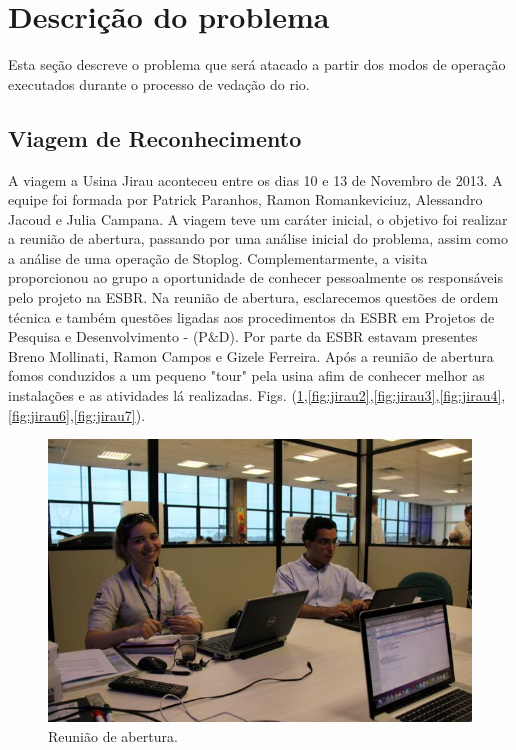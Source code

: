 

\section{Descrição do problema}
Esta seção descreve o problema que será atacado a partir dos modos de operação
executados durante o processo de vedação do rio.

\subsection{Viagem de Reconhecimento}
A viagem a Usina Jirau aconteceu entre os dias 10 e 13 de Novembro de 2013. A
equipe foi formada por Patrick Paranhos, Ramon Romankeviciuz, Alessandro Jacoud
e Julia Campana. A viagem teve um caráter inicial, o objetivo foi realizar a
reunião de abertura, passando por  uma análise inicial do problema, assim como a
análise de uma operação de Stoplog. Complementarmente, a visita proporcionou ao
grupo a oportunidade de conhecer pessoalmente os responsáveis pelo projeto na
ESBR.
Na reunião de abertura, esclarecemos questões de ordem técnica e também questões
ligadas aos procedimentos da ESBR em Projetos de Pesquisa e Desenvolvimento -
(P$\&$D).  Por parte da ESBR estavam presentes Breno Mollinati, Ramon Campos e
Gizele Ferreira. Após a reunião de abertura fomos conduzidos a um pequeno "tour"
pela usina afim de conhecer melhor as instalações e as atividades lá realizadas.
Figs.
(\ref{fig:jirau1},\ref{fig:jirau2},\ref{fig:jirau3},\ref{fig:jirau4},\ref{fig:jirau6},\ref{fig:jirau7}).

 \begin{figure}[ht!]
    \centering \includegraphics[width=0.6\columnwidth]{figs/jirau/jirau_01}
    \caption{Reunião de abertura.}
    \label{fig:jirau1}
\end{figure}

